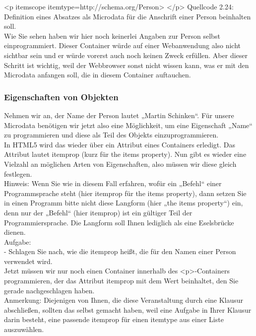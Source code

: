 <p itemscope itemtype=http://schema.org/Person>
</p>
Quellcode 2.24: Definition eines Absatzes als Microdata für die Anschrift einer Person beinhalten soll.\\

Wie Sie sehen haben wir hier noch keinerlei Angaben zur Person selbst einprogrammiert. Dieser Container würde auf einer Webanwendung also nicht sichtbar sein und er würde vorerst auch noch keinen Zweck erfüllen. Aber dieser Schritt ist wichtig, weil der Webbrowser sonst nicht wissen kann, was er mit den Microdata anfangen soll, die in diesem Container auftauchen.

\subsubsection{Eigenschaften von Objekten}

Nehmen wir an, der Name der Person lautet „Martin Schinken“. Für unsere Microdata benötigen wir jetzt also eine Möglichkeit, um eine Eigenschaft „Name“ zu programmieren und diese als Teil des Objekts einzuprogrammieren.\\

In HTML5 wird das wieder über ein Attribut eines Containers erledigt. Das Attribut lautet itemprop (kurz für the items property). Nun gibt es wieder eine Vielzahl an möglichen Arten von Eigenschaften, also müssen wir diese gleich festlegen.\\

Hinweis: Wenn Sie wie in diesem Fall  erfahren, wofür ein „Befehl“ einer Programmsprache steht (hier itemprop für the items property), dann setzen Sie in einen Programm bitte nicht diese Langform (hier „the items property“) ein, denn nur der „Befehl“ (hier itemprop) ist ein gültiger Teil der Programmiersprache. Die Langform soll Ihnen lediglich als eine Eselsbrücke dienen.\\

Aufgabe:\\

-	Schlagen Sie nach, wie die itemprop heißt, die für den Namen einer Person verwendet wird.\\

Jetzt müssen wir nur noch einen Container innerhalb des <p>-Containers programmieren, der das Attribut itemprop mit dem Wert beinhaltet, den Sie gerade nachgeschlagen haben. \\

Anmerkung: Diejenigen von Ihnen, die diese Veranstaltung durch eine Klausur abschließen, sollten das selbst gemacht haben, weil eine Aufgabe in Ihrer Klausur darin besteht, eine passende itemprop für einen itemtype aus einer Liste auszuwählen.\\

